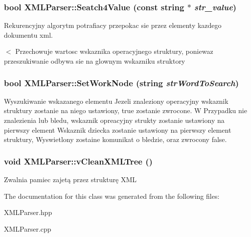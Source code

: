 \hypertarget{classXMLParser_aed814f771d1ed12b0f27288c12d9a59d}{
\subsubsection[{Seatch4Value}]{\setlength{\rightskip}{0pt plus 5cm}bool XMLParser::Seatch4Value (const string $\ast$ {\em str\_\-value})}}
\label{classXMLParser_aed814f771d1ed12b0f27288c12d9a59d}


Rekurencyjny algorytm potrafiacy przepokac sie przez elementy kazdego dokumentu xml.

$<$ Przechowuje wartosc wskaznika operacyjnego struktury, poniewaz przeszukiwanie odbywa sie na glownym wskazniku struktory 

\hypertarget{classXMLParser_ab05e61d34c570a1d08271a73203966a0}{
\subsubsection[{SetWorkNode}]{\setlength{\rightskip}{0pt plus 5cm}bool XMLParser::SetWorkNode (string {\em strWordToSearch})}}
\label{classXMLParser_ab05e61d34c570a1d08271a73203966a0}


Wyszukiwanie wskazanego elementu Jezeli znaleziony operacyjny wskaznik struktury zostanie na niego ustawiony, true zostanie zwrocone. W Przypadku nie znalezienia lub bledu, wskaznik opreacyjny strukty zostanie ustawiony na pierwszy element Wskaznik dziecka zostanie ustawiony na pierwszy element struktury, Wyswietlony zostaine komunikat o bledzie, oraz zwrocony false.

\hypertarget{classXMLParser_ac4725bcded634f7acdbc3cb9608d8d09}{
\subsubsection[{vCleanXMLTree}]{\setlength{\rightskip}{0pt plus 5cm}void XMLParser::vCleanXMLTree ()}}
\label{classXMLParser_ac4725bcded634f7acdbc3cb9608d8d09}


Zwalnia pamiec zajetą przez strukturę XML 



The documentation for this class was generated from the following files:\begin{DoxyCompactItemize}
\item 
XMLParser.hpp\item 
XMLParser.cpp\end{DoxyCompactItemize}
